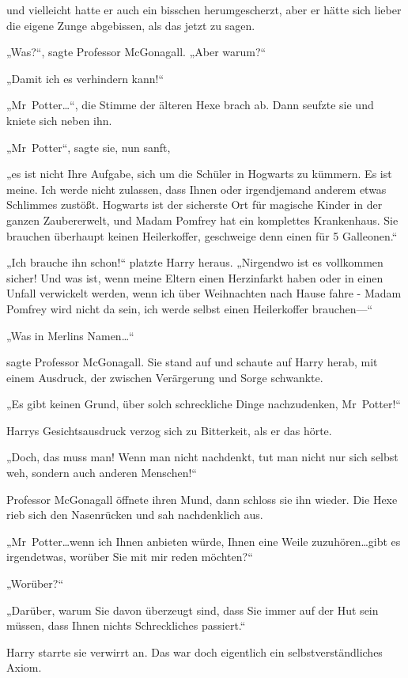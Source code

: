 {und vielleicht hatte er auch ein bisschen herumgescherzt, aber er hätte sich lieber die eigene Zunge abgebissen, als das jetzt zu sagen.

„Was?“, sagte Professor McGonagall. „Aber warum?“

„Damit ich es verhindern kann!“

„Mr~Potter…“, die Stimme der älteren Hexe brach ab. Dann seufzte sie und kniete sich neben ihn.

„Mr~Potter“, sagte sie, nun sanft,

„es ist nicht Ihre Aufgabe, sich um die Schüler in Hogwarts zu kümmern. Es ist meine. Ich werde nicht zulassen, dass Ihnen oder irgendjemand anderem etwas Schlimmes zustößt. Hogwarts ist der sicherste Ort für magische Kinder in der ganzen Zaubererwelt, und Madam Pomfrey hat ein komplettes Krankenhaus. Sie brauchen überhaupt keinen Heilerkoffer, geschweige denn einen für 5 Galleonen.“

„Ich brauche ihn schon!“ platzte Harry heraus. „Nirgendwo ist es vollkommen sicher! Und was ist, wenn meine Eltern einen Herzinfarkt haben oder in einen Unfall verwickelt werden, wenn ich über Weihnachten nach Hause fahre - Madam Pomfrey wird nicht da sein, ich werde selbst einen Heilerkoffer brauchen—“

„Was in Merlins Namen…“

sagte Professor McGonagall. Sie stand auf und schaute auf Harry herab, mit einem Ausdruck, der zwischen Verärgerung und Sorge schwankte.

„Es gibt keinen Grund, über solch schreckliche Dinge nachzudenken, Mr~Potter!“

Harrys Gesichtsausdruck verzog sich zu Bitterkeit, als er das hörte.

„Doch, das muss man! Wenn man nicht nachdenkt, tut man nicht nur sich selbst weh, sondern auch anderen Menschen!“

Professor McGonagall öffnete ihren Mund, dann schloss sie ihn wieder. Die Hexe rieb sich den Nasenrücken und sah nachdenklich aus.

„Mr~Potter…wenn ich Ihnen anbieten würde, Ihnen eine Weile zuzuhören…gibt es irgendetwas, worüber Sie mit mir reden möchten?“

„Worüber?“

„Darüber, warum Sie davon überzeugt sind, dass Sie immer auf der Hut sein müssen, dass Ihnen nichts Schreckliches passiert.“

Harry starrte sie verwirrt an. Das war doch eigentlich ein selbstverständliches Axiom.

}
